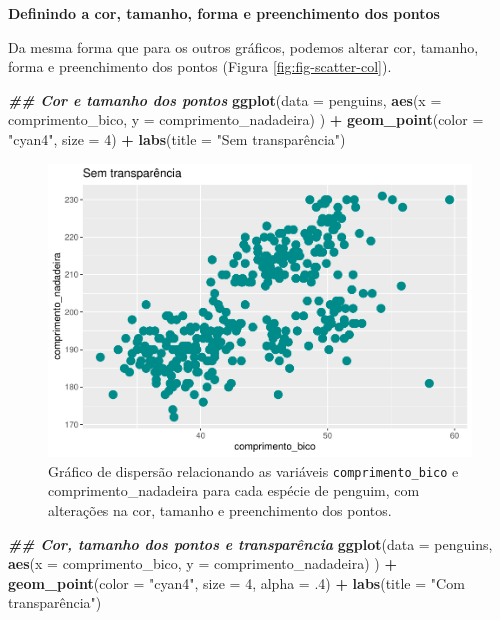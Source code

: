 \documentclass[
]{article}
\newenvironment{Shaded}{\begin{snugshade}}{\end{snugshade}}
\newcommand{\AttributeTok}[1]{\textcolor[rgb]{0.13,0.29,0.53}{#1}}
\newcommand{\DecValTok}[1]{\textcolor[rgb]{0.00,0.00,0.81}{#1}}
\newcommand{\DocumentationTok}[1]{\textcolor[rgb]{0.56,0.35,0.01}{\textbf{\textit{#1}}}}
\newcommand{\FunctionTok}[1]{\textcolor[rgb]{0.13,0.29,0.53}{\textbf{#1}}}
\newcommand{\NormalTok}[1]{#1}
\newcommand{\SpecialCharTok}[1]{\textcolor[rgb]{0.81,0.36,0.00}{\textbf{#1}}}
\newcommand{\StringTok}[1]{\textcolor[rgb]{0.31,0.60,0.02}{#1}}
\begin{document}
\textbf{Definindo a cor, tamanho, forma e preenchimento dos pontos}

Da mesma forma que para os outros gráficos, podemos alterar cor, tamanho, forma e preenchimento dos pontos (Figura \ref{fig:fig-scatter-col}).

\begin{Shaded}
\begin{Highlighting}[]
\DocumentationTok{\#\# Cor e tamanho dos pontos }
\FunctionTok{ggplot}\NormalTok{(}\AttributeTok{data =}\NormalTok{ penguins, }
       \FunctionTok{aes}\NormalTok{(}\AttributeTok{x =}\NormalTok{ comprimento\_bico, }\AttributeTok{y =}\NormalTok{ comprimento\_nadadeira)}
\NormalTok{       ) }\SpecialCharTok{+}
    \FunctionTok{geom\_point}\NormalTok{(}\AttributeTok{color =} \StringTok{"cyan4"}\NormalTok{, }\AttributeTok{size =} \DecValTok{4}\NormalTok{) }\SpecialCharTok{+} 
    \FunctionTok{labs}\NormalTok{(}\AttributeTok{title =} \StringTok{"Sem transparência"}\NormalTok{)}
\end{Highlighting}
\end{Shaded}

\begin{figure}
\centering
\includegraphics{epr_files/figure-latex/fig-scatter-col-1.pdf}
\caption{\label{fig:fig-scatter-col-1}Gráfico de dispersão relacionando as variáveis \texttt{comprimento\_bico} e comprimento\_nadadeira para cada espécie de penguim, com alterações na cor, tamanho e preenchimento dos pontos.}
\end{figure}

\begin{Shaded}
\begin{Highlighting}[]
\DocumentationTok{\#\# Cor, tamanho dos pontos e transparência}
\FunctionTok{ggplot}\NormalTok{(}\AttributeTok{data =}\NormalTok{ penguins, }
       \FunctionTok{aes}\NormalTok{(}\AttributeTok{x =}\NormalTok{ comprimento\_bico, }\AttributeTok{y =}\NormalTok{ comprimento\_nadadeira)}
\NormalTok{       ) }\SpecialCharTok{+}
    \FunctionTok{geom\_point}\NormalTok{(}\AttributeTok{color =} \StringTok{"cyan4"}\NormalTok{, }\AttributeTok{size =} \DecValTok{4}\NormalTok{, }\AttributeTok{alpha =}\NormalTok{ .}\DecValTok{4}\NormalTok{) }\SpecialCharTok{+}
    \FunctionTok{labs}\NormalTok{(}\AttributeTok{title =} \StringTok{"Com transparência"}\NormalTok{)}
\end{Highlighting}
\end{Shaded}
\end{document}
